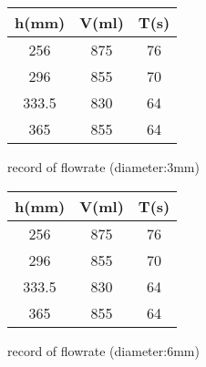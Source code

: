 \begin{minipage}{\textwidth}

    \begin{minipage}[t]{0.5\textwidth}
        \centering
    \makeatletter{}
    \begin{tabular}{ccc}
        \toprule
        h(mm)                       & V(ml)                    & T(s)  \\
        \midrule
        256                     & 875                  & 76     \\
        296                     & 855                  & 70     \\
        333.5                   & 830                  & 64     \\
        365                     & 855                  & 64     \\
        \bottomrule
    \end{tabular}
    \caption{record of flowrate (diameter:3mm)}
    \end{minipage}
    \begin{minipage}[t]{0.5\textwidth}
        \centering
    \makeatletter{}
    \begin{tabular}{ccc}
        \toprule
        h(mm)                       & V(ml)                    & T(s)  \\
        \midrule
        256                     & 875                  & 76     \\
        296                     & 855                  & 70     \\
        333.5                   & 830                  & 64     \\
        365                     & 855                  & 64     \\
        \bottomrule
    \end{tabular}
    \caption{record of flowrate (diameter:6mm)}
    \end{minipage}
    \end{minipage}
    













